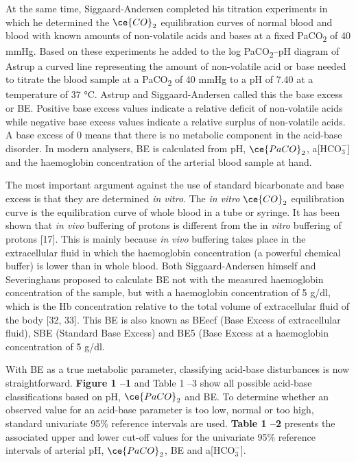 \documentclass[
  12pt,
  a4paperpaper,
]{report}
\begin{document}
At the same time, Siggaard-Andersen completed his titration experiments
in which he determined the \(\ce{CO}_{2}\) equilibration curves of
normal blood and blood with known amounts of non-volatile acids and
bases at a fixed Pa\textsc{CO}\textsubscript{2} of 40 mmHg. Based on
these experiments he added to the log Pa\textsc{CO}\textsubscript{2}--pH
diagram of Astrup a curved line representing the amount of non-volatile
acid or base needed to titrate the blood sample at a
Pa\textsc{CO}\textsubscript{2} of 40 mmHg to a pH of 7.40 at a
temperature of 37 °C. Astrup and Siggaard-Andersen called this the base
excess or BE. Positive base excess values indicate a relative deficit of
non-volatile acids while negative base excess values indicate a relative
surplus of non-volatile acids. A base excess of 0 means that there is no
metabolic component in the acid-base disorder. In modern analysers, BE
is calculated from pH, \(\ce{PaCO}_{2}\), a{[}\(\text{HCO}_{3}^{-}\){]}
and the haemoglobin concentration of the arterial blood sample at hand.

The most important argument against the use of standard bicarbonate and
base excess is that they are determined \emph{in vitro}. The \emph{in
vitro} \(\ce{CO}_{2}\) equilibration curve is the equilibration curve of
whole blood in a tube or syringe. It has been shown that \emph{in vivo}
buffering of protons is different from the in \emph{vitro} buffering of
protons {[}17{]}. This is mainly because \emph{in vivo} buffering takes
place in the extracellular fluid in which the haemoglobin concentration
(a powerful chemical buffer) is lower than in whole blood. Both
Siggaard-Andersen himself and Severinghaus proposed to calculate BE not
with the measured haemoglobin concentration of the sample, but with a
haemoglobin concentration of 5 g/dl, which is the Hb concentration
relative to the total volume of extracellular fluid of the body {[}32,
33{]}. This BE is also known as BEecf (Base Excess of extracellular
fluid), SBE (Standard Base Excess) and BE5 (Base Excess at a haemoglobin
concentration of 5 g/dl.

With BE as a true metabolic parameter, classifying acid-base
disturbances is now straightforward. \textbf{Figure 1 --1} and Table 1
--3 show all possible acid-base classifications based on pH,
\(\ce{PaCO}_{2}\) and BE. To determine whether an observed value for an
acid-base parameter is too low, normal or too high, standard univariate
95\% reference intervals are used. \textbf{Table 1 --2} presents the
associated upper and lower cut-off values for the univariate 95\%
reference intervals of arterial pH, \(\ce{PaCO}_{2}\), BE and
a{[}\(\text{HCO}_{3}^{-}\){]}.
\end{document}

